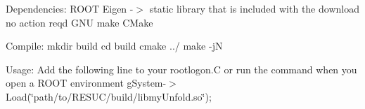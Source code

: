 Dependencies\+: ROOT Eigen -\/\texorpdfstring{$>$}{>} static library that is included with the download no action req\textquotesingle{}d GNU make CMake

Compile\+: mkdir build cd build cmake ../ make -\/jN

Usage\+: Add the following line to your rootlogon.\+C or run the command when you open a ROOT environment g\+System-\/\texorpdfstring{$>$}{>}Load(\char`\"{}path/to/\+RESUC/build/libmy\+Unfold.\+so\char`\"{}); 
